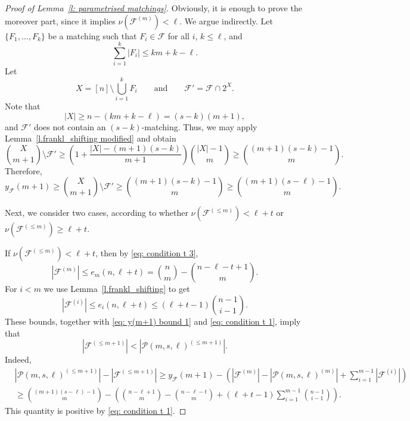 \documentclass{article}
\begin{document}
\begin{proof}[Proof of Lemma~\ref{l: parametrised matchings}]
Obviously, it is enough to prove the moreover part, since it implies $\nu(\mathcal{F}^{(m)}) < \ell$. We argue indirectly. Let $\{F_1, \ldots, F_k\}$ be a matching such that $F_i \in \mathcal{F}$ for all $i$, $k \leq \ell$, and
\[
\sum_{i=1}^k |F_i| \leq km + k - \ell.
\]
Let
\[
X = [n] \setminus \bigcup_{i=1}^k F_i
\qquad\text{and}\qquad
\mathcal{F}' = \mathcal{F} \cap 2^{X}.
\]
Note that
\[
|X| \geq n - (km+k-\ell) = (s-k)(m + 1),
\]
and $\mathcal{F}'$ does not contain an $(s-k)$-matching. Thus, we may apply Lemma~\ref{l.frankl_shifting modified} and obtain
{\small
\[
{X\choose m+1}\setminus \mathcal{F}' \geq \left(1 + \frac{|X| - (m+1)(s-k)}{m+1}\right){|X| - 1 \choose m} \geq {(m+1)(s-k) - 1 \choose m}.
\]
}
Therefore,
{\small
\begin{equation} \label{eq: y(m+1) bound 1}
    y_{\mathcal{F}}(m+1)
    \geq {X\choose m+1}\setminus \mathcal{F}'
    \geq {(m+1)(s-k) - 1 \choose m}
    \geq {(m+1)(s - \ell) - 1 \choose m}.
\end{equation}
}

Next, we consider two cases, according to whether $\nu(\mathcal{F}^{(\leq m)}) < \ell + t$ or $\nu(\mathcal{F}^{(\leq m)}) \geq \ell + t$.

If $\nu(\mathcal{F}^{(\leq m)}) < \ell + t$, then by \eqref{eq: condition t 3},
\[
|\mathcal{F}^{(m)}| \leq e_{m}(n, \ell + t) = {n \choose m} - {n - \ell - t + 1 \choose m}.
\]
For $i < m$ we use Lemma~\ref{l.frankl_shifting} to get
\[
|\mathcal{F}^{(i)}| \leq e_{i}(n, \ell + t) \leq (\ell+t-1){n-1 \choose i - 1}.
\]
These bounds, together with \eqref{eq: y(m+1) bound 1} and \eqref{eq: condition t 1}, imply that
\[
|\mathcal{F}^{(\leq m+1)}| < |\mathcal{P}(m, s, \ell)^{(\leq m+1)}|.
\]
Indeed,
{\small
\begin{align*}
    &|\mathcal{P}(m, s, \ell)^{(\leq m+1)}| - |\mathcal{F}^{(\leq m+1)}| \geq y_{\mathcal{F}}(m+1) - \left(|\mathcal{F}^{(m)}| - |\mathcal{P}(m, s, \ell)^{(m)}| + \sum_{i=1}^{m-1}|\mathcal{F}^{(i)}|\right) \\
    &\geq {(m+1)(s-\ell)-1 \choose m} - \left({n - \ell + 1 \choose m} - {n - \ell - t \choose m} + (\ell+t-1)\sum_{i=1}^{m-1}{n-1 \choose i-1} \right).
\end{align*}
}
This quantity is positive by \eqref{eq: condition t 1}.


\end{proof}
\end{document}
